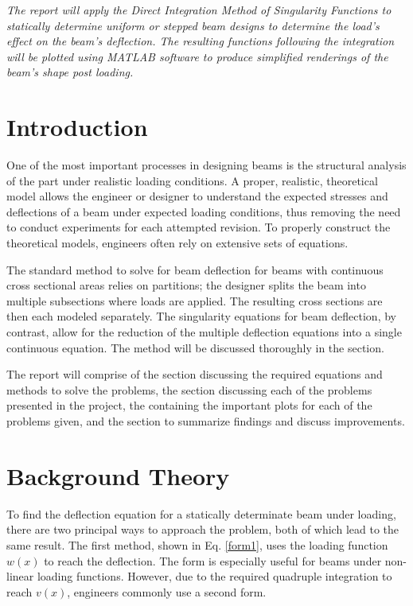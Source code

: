 \documentclass[a4paper]{article}
\begin{document}



\large
\textit{The report will apply the Direct Integration Method of Singularity Functions to statically determine uniform or stepped beam designs to determine the load's effect on the beam's deflection. The resulting functions following the integration will be plotted using MATLAB software to produce simplified renderings of the beam's shape post loading.}

\tableofcontents

\section{Introduction} \label{Introduction}
One of the most important processes in designing beams is the structural analysis of the part under realistic loading conditions. A proper, realistic, theoretical model allows the engineer or designer to understand the expected stresses and deflections of a beam under expected loading conditions, thus removing the need to conduct experiments for each attempted revision. To properly construct the theoretical models, engineers often rely on extensive sets of equations.

The standard method to solve for beam deflection for beams with continuous cross sectional areas relies on partitions; the designer splits the beam into multiple subsections where loads are applied. The resulting cross sections are then each modeled separately. The singularity equations for beam deflection, by contrast, allow for the reduction of the multiple deflection equations into a single continuous equation. The method will be discussed thoroughly in the  section.

The report will comprise of the  section discussing the required equations and methods to solve the problems, the  section discussing each of the problems presented in the project, the  containing the important plots for each of the problems given, and the  section to summarize findings and discuss improvements.

\section{Background Theory} \label{Background Theory}
To find the deflection equation for a statically determinate beam under loading, there are two principal ways to approach the problem, both of which lead to the same result. The first method, shown in Eq. \ref{form1}, uses the loading function $w(x)$ to reach the deflection. The form is especially useful for beams under non-linear loading functions. However, due to the required quadruple integration to reach $v(x)$, engineers commonly use a second form.
\end{document}
